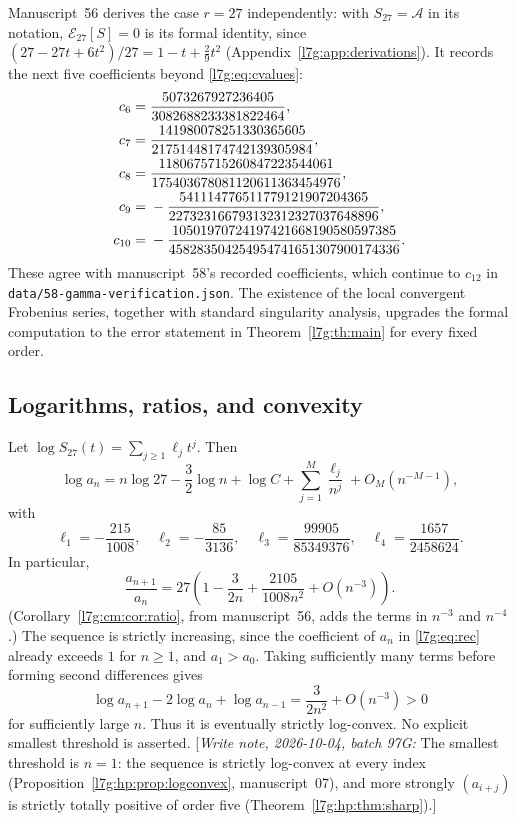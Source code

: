 \documentclass[11pt,letterpaper]{article}
\newcommand{\file}[1]{\nolinkurl{#1}}
\theoremstyle{remark}\newtheorem{remark}[theorem]{Remark}
\newcommand{\hpnote}[1]{\textup{[}\emph{Write note, 2026-10-04, batch 97G:} #1\textup{]}}
\newcounter{l7gtrsavedeq}
\begin{document}
Manuscript~56 derives the case $r=27$ independently: with
$S_{27}=\mathcal A$ in its notation, $\mathcal E_{27}[S]=0$ is its formal
identity, since $(27-27t+6t^2)/27=1-t+\tfrac29t^2$
(Appendix~\ref{l7g:app:derivations}). It records the next five
coefficients beyond \eqref{l7g:eq:cvalues}:
\begin{align}
 c_6={}&
 \frac{5073267927236405}{3082688233381822464},\notag\\
 c_7={}&
 \frac{141980078251330365605}{21751448174742139305984},\notag\\
 c_8={}&
 \frac{1180675715260847223544061}
 {175403678081120611363454976},\notag\\
 c_9={}&
 -\frac{541114776511779121907204365}
 {227323166793132312327037648896},\notag\\
 c_{10}={}&
 -\frac{10501970724197421668190580597385}
 {458283504254954741651307900174336}.
 \label{l7g:cm:eq:alpha-more}
\end{align}
These agree with manuscript~58's recorded coefficients, which continue to
$c_{12}$ in \file{data/58-gamma-verification.json}. The existence of the
local convergent Frobenius series, together with standard singularity
analysis, upgrades the formal computation to the error statement in
Theorem~\ref{l7g:th:main} for every fixed order.

\subsection{Logarithms, ratios, and convexity}\label{l7g:sec:logratio}
Let $\log S_{27}(t)=\sum_{j\ge1}\ell_jt^j$. Then
\begin{equation}\label{l7g:eq:logexp}
 \log a_n=n\log27-\frac32\log n+\log C
             +\sum_{j=1}^M\frac{\ell_j}{n^j}+O_M(n^{-M-1}),
\end{equation}
with
\begin{equation}\label{l7g:eq:ellvalues}
 \ell_1=-\frac{215}{1008},\quad\ell_2=-\frac{85}{3136},\quad
 \ell_3=\frac{99905}{85349376},\quad\ell_4=\frac{1657}{2458624}.
\end{equation}
In particular,
\begin{equation}\label{l7g:eq:ratio}
 \frac{a_{n+1}}{a_n}
 =27\left(1-\frac{3}{2n}+\frac{2105}{1008n^2}+O(n^{-3})\right).
\end{equation}
(Corollary~\ref{l7g:cm:cor:ratio}, from manuscript~56, adds the terms in
$n^{-3}$ and $n^{-4}$.)
The sequence is strictly increasing, since the coefficient of $a_n$ in
\eqref{l7g:eq:rec} already exceeds $1$ for $n\ge1$, and $a_1>a_0$.
Taking sufficiently many terms before forming second differences gives
\[
 \log a_{n+1}-2\log a_n+\log a_{n-1}
 =\frac{3}{2n^2}+O(n^{-3})>0
\]
for sufficiently large $n$. Thus it is eventually strictly log-convex.
No explicit smallest threshold is asserted.
\hpnote{The smallest threshold is $n=1$: the sequence is strictly
log-convex at every index (Proposition~\ref{l7g:hp:prop:logconvex},
manuscript~07), and more strongly $(a_{i+j})$ is strictly totally positive
of order five (Theorem~\ref{l7g:hp:thm:sharp}).}
\end{document}
